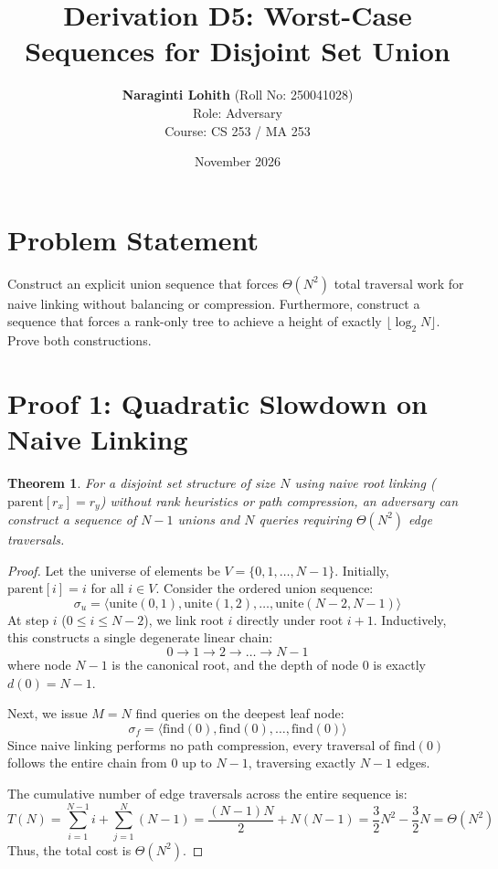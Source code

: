 \documentclass[11pt,a4paper]{article}
\title{\textbf{Derivation D5: Worst-Case Sequences for Disjoint Set Union}}
\author{\textbf{Naraginti Lohith} (Roll No: 250041028) \\ Role: Adversary \\ Course: CS 253 / MA 253}
\date{November 2026}
\newtheorem{theorem}{Theorem}
\begin{document}
\maketitle

\section{Problem Statement}
Construct an explicit union sequence that forces $\Theta(N^2)$ total traversal work for naive linking without balancing or compression. Furthermore, construct a sequence that forces a rank-only tree to achieve a height of exactly $\lfloor \log_2 N \rfloor$. Prove both constructions.

\section{Proof 1: Quadratic Slowdown on Naive Linking}
\begin{theorem}
For a disjoint set structure of size $N$ using naive root linking ($\text{parent}[r_x] = r_y$) without rank heuristics or path compression, an adversary can construct a sequence of $N-1$ unions and $N$ queries requiring $\Theta(N^2)$ edge traversals.
\end{theorem}

\begin{proof}
Let the universe of elements be $V = \{0, 1, \dots, N-1\}$. Initially, $\text{parent}[i] = i$ for all $i \in V$.
Consider the ordered union sequence:
\[
\sigma_u = \langle \text{unite}(0, 1), \text{unite}(1, 2), \dots, \text{unite}(N-2, N-1) \rangle
\]
At step $i$ ($0 \le i \le N-2$), we link root $i$ directly under root $i+1$. Inductively, this constructs a single degenerate linear chain:
\[
0 \to 1 \to 2 \to \dots \to N-1
\]
where node $N-1$ is the canonical root, and the depth of node $0$ is exactly $d(0) = N-1$.

Next, we issue $M = N$ find queries on the deepest leaf node:
\[
\sigma_f = \langle \text{find}(0), \text{find}(0), \dots, \text{find}(0) \rangle
\]
Since naive linking performs no path compression, every traversal of $\text{find}(0)$ follows the entire chain from $0$ up to $N-1$, traversing exactly $N-1$ edges.

The cumulative number of edge traversals across the entire sequence is:
\[
T(N) = \sum_{i=1}^{N-1} i + \sum_{j=1}^N (N-1) = \frac{(N-1)N}{2} + N(N-1) = \frac{3}{2}N^2 - \frac{3}{2}N = \Theta(N^2)
\]
Thus, the total cost is $\Theta(N^2)$. \qedhere
\end{proof}
\end{document}
